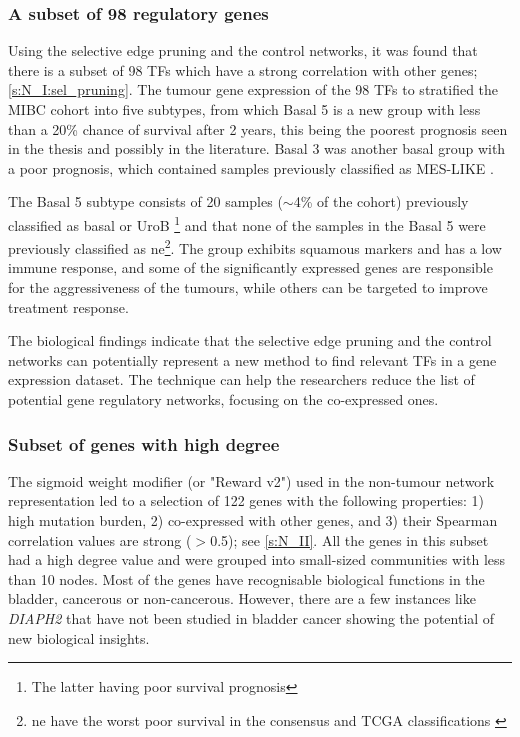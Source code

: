 \subsubsection*{A subset of 98 regulatory genes}

Using the selective edge pruning and the control networks, it was found that there is a subset of 98 TFs which have a strong correlation with other genes; \cref{s:N_I:sel_pruning}. The tumour gene expression of the 98 TFs to stratified the MIBC cohort into five subtypes, from which Basal 5 is a new group with less than a 20\% chance of survival after 2 years, this being the poorest prognosis seen in the thesis and possibly in the literature. Basal 3 was another basal group with a poor prognosis, which contained samples previously classified as \gls{MES-LIKE} \citep{Marzouka2018-ge}.

The Basal 5 subtype consists of 20 samples ($\sim$4\% of the cohort) previously classified as basal \citep{Kamoun2020-tj,Robertson2017-mg} or UroB \citep{Marzouka2018-ge}\footnote{The latter having poor survival prognosis} and that none of the samples in the Basal 5 were previously classified as \acrlong{ne}\footnote{\acrlong{ne} have the worst poor survival in the consensus and TCGA classifications \citep{Kamoun2020-tj,Robertson2017-mg}}. The group exhibits squamous markers and has a low immune response, and some of the significantly expressed genes are responsible for the aggressiveness of the tumours, while others can be targeted to improve treatment response.

The biological findings indicate that the selective edge pruning and the control networks can potentially represent a new method to find relevant \gls{TF}s in a gene expression dataset. The technique can help the researchers reduce the list of potential gene regulatory networks, focusing on the co-expressed ones.

\subsubsection*{Subset of genes with high degree}

The sigmoid weight modifier (or "Reward v2") used in the non-tumour network representation led to a selection of 122 genes with the following properties: 1) high mutation burden, 2) co-expressed with other genes, and 3) their Spearman correlation values are strong (\(>\)0.5); see \cref{s:N_II}. All the genes in this subset had a high degree value and were grouped into small-sized communities with less than 10 nodes. Most of the genes have recognisable biological functions in the bladder, cancerous or non-cancerous. However, there are a few instances like \textit{DIAPH2} that have not been studied in bladder cancer showing the potential of new biological insights.

